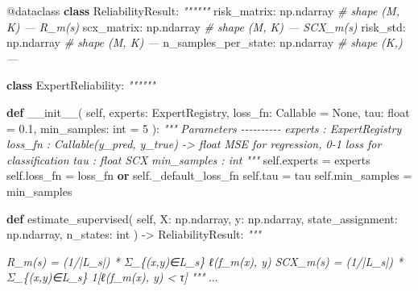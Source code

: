 \documentclass[
  12pt,
]{article}
\newenvironment{Shaded}{}{}
\newcommand{\AttributeTok}[1]{\textcolor[rgb]{0.49,0.56,0.16}{#1}}
\newcommand{\BuiltInTok}[1]{\textcolor[rgb]{0.00,0.50,0.00}{#1}}
\newcommand{\CommentTok}[1]{\textcolor[rgb]{0.38,0.63,0.69}{\textit{#1}}}
\newcommand{\DecValTok}[1]{\textcolor[rgb]{0.25,0.63,0.44}{#1}}
\newcommand{\FloatTok}[1]{\textcolor[rgb]{0.25,0.63,0.44}{#1}}
\newcommand{\FunctionTok}[1]{\textcolor[rgb]{0.02,0.16,0.49}{#1}}
\newcommand{\KeywordTok}[1]{\textcolor[rgb]{0.00,0.44,0.13}{\textbf{#1}}}
\newcommand{\NormalTok}[1]{#1}
\newcommand{\OperatorTok}[1]{\textcolor[rgb]{0.40,0.40,0.40}{#1}}
\newcommand{\VariableTok}[1]{\textcolor[rgb]{0.10,0.09,0.49}{#1}}
\begin{document}
\begin{Shaded}
\begin{Highlighting}[]
\AttributeTok{@dataclass}
\KeywordTok{class}\NormalTok{ ReliabilityResult:}
    \CommentTok{""""""}
\NormalTok{    risk\_matrix: np.ndarray            }\CommentTok{\# shape (M, K) — R\_m(s)}
\NormalTok{    scx\_matrix: np.ndarray             }\CommentTok{\# shape (M, K) — SCX\_m(s)}
\NormalTok{    risk\_std: np.ndarray               }\CommentTok{\# shape (M, K) — }
\NormalTok{    n\_samples\_per\_state: np.ndarray    }\CommentTok{\# shape (K,) — }

\KeywordTok{class}\NormalTok{ ExpertReliability:}
    \CommentTok{""""""}

    \KeywordTok{def} \FunctionTok{\_\_init\_\_}\NormalTok{(}
        \VariableTok{self}\NormalTok{,}
\NormalTok{        experts: ExpertRegistry,}
\NormalTok{        loss\_fn: Callable }\OperatorTok{=} \VariableTok{None}\NormalTok{,}
\NormalTok{        tau: }\BuiltInTok{float} \OperatorTok{=} \FloatTok{0.1}\NormalTok{,}
\NormalTok{        min\_samples: }\BuiltInTok{int} \OperatorTok{=} \DecValTok{5}
\NormalTok{    ):}
        \CommentTok{"""}
\CommentTok{        Parameters}
\CommentTok{        {-}{-}{-}{-}{-}{-}{-}{-}{-}{-}}
\CommentTok{        experts : ExpertRegistry}
\CommentTok{        loss\_fn : Callable(y\_pred, y\_true) {-}\textgreater{} float}
\CommentTok{            MSE for regression, 0{-}1 loss for classification}
\CommentTok{        tau : float}
\CommentTok{            SCX }
\CommentTok{        min\_samples : int}
\CommentTok{            }
\CommentTok{        """}
        \VariableTok{self}\NormalTok{.experts }\OperatorTok{=}\NormalTok{ experts}
        \VariableTok{self}\NormalTok{.loss\_fn }\OperatorTok{=}\NormalTok{ loss\_fn }\KeywordTok{or} \VariableTok{self}\NormalTok{.\_default\_loss\_fn}
        \VariableTok{self}\NormalTok{.tau }\OperatorTok{=}\NormalTok{ tau}
        \VariableTok{self}\NormalTok{.min\_samples }\OperatorTok{=}\NormalTok{ min\_samples}

    \KeywordTok{def}\NormalTok{ estimate\_supervised(}
        \VariableTok{self}\NormalTok{,}
\NormalTok{        X: np.ndarray,}
\NormalTok{        y: np.ndarray,}
\NormalTok{        state\_assignment: np.ndarray,}
\NormalTok{        n\_states: }\BuiltInTok{int}
\NormalTok{    ) }\OperatorTok{{-}\textgreater{}}\NormalTok{ ReliabilityResult:}
        \CommentTok{"""}

\CommentTok{        R\_m(s) = (1/|L\_s|) * Σ\_\{(x,y)∈L\_s\} ℓ(f\_m(x), y)}
\CommentTok{        SCX\_m(s) = (1/|L\_s|) * Σ\_\{(x,y)∈L\_s\} 1[ℓ(f\_m(x), y) \textless{} τ]}
\CommentTok{        """}
\NormalTok{        ...}


\end{Highlighting}
\end{Shaded}
\end{document}
